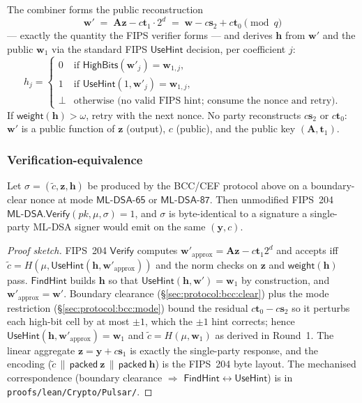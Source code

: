 The combiner forms the public reconstruction
\[
  \mathbf{w}' \;=\; \mathbf{A}\mathbf{z} - c\mathbf{t}_1 \cdot 2^d
  \;=\; \mathbf{w} - c\mathbf{s}_2 + c\mathbf{t}_0
  \pmod q
\]
--- exactly the quantity the FIPS verifier forms --- and derives
$\mathbf{h}$ from $\mathbf{w}'$ and the public $\mathbf{w}_1$ via the
standard FIPS $\mathsf{UseHint}$ decision, per coefficient $j$:
\[
  h_j =
  \begin{cases}
    0 & \text{if } \mathsf{HighBits}(\mathbf{w}'_j) = \mathbf{w}_{1,j}, \\
    1 & \text{if } \mathsf{UseHint}(1, \mathbf{w}'_j) = \mathbf{w}_{1,j}, \\
    \bot & \text{otherwise (no valid FIPS hint; consume the nonce and retry).}
  \end{cases}
\]
If $\mathsf{weight}(\mathbf{h}) > \omega$, retry with the next nonce. No
party reconstructs $c\mathbf{s}_2$ or $c\mathbf{t}_0$: $\mathbf{w}'$ is a
public function of $\mathbf{z}$ (output), $c$ (public), and the public
key $(\mathbf{A}, \mathbf{t}_1)$.

\subsubsection{Verification-equivalence}
\label{sec:protocol:bcc:equiv}

\begin{theorem}
\label{thm:bcc-byte-equal}
Let $\sigma = (\tilde c, \mathbf{z}, \mathbf{h})$ be produced by the
BCC/CEF protocol above on a boundary-clear nonce at mode
$\mathsf{ML\text{-}DSA\text{-}65}$ or $\mathsf{ML\text{-}DSA\text{-}87}$.
Then unmodified FIPS~204 $\mathsf{ML\text{-}DSA.Verify}(\mathit{pk},
\mu, \sigma) = 1$, and $\sigma$ is byte-identical to a signature a
single-party ML-DSA signer would emit on the same $(\mathbf{y}, c)$.
\end{theorem}

\begin{proof}[Proof sketch]
FIPS~204 $\mathsf{Verify}$ computes $\mathbf{w}'_{\text{approx}} =
\mathbf{A}\mathbf{z} - c\mathbf{t}_1 2^d$ and accepts iff $\tilde c =
H(\mu, \mathsf{UseHint}(\mathbf{h}, \mathbf{w}'_{\text{approx}}))$ and the
norm checks on $\mathbf{z}$ and $\mathsf{weight}(\mathbf{h})$ pass.
$\mathsf{FindHint}$ builds $\mathbf{h}$ so that
$\mathsf{UseHint}(\mathbf{h}, \mathbf{w}') = \mathbf{w}_1$ by
construction, and $\mathbf{w}'_{\text{approx}} = \mathbf{w}'$. Boundary
clearance (\S\ref{sec:protocol:bcc:clear}) plus the mode restriction
(\S\ref{sec:protocol:bcc:mode}) bound the residual $c\mathbf{t}_0 -
c\mathbf{s}_2$ so it perturbs each high-bit cell by at most $\pm 1$,
which the $\pm 1$ hint corrects; hence $\mathsf{UseHint}(\mathbf{h},
\mathbf{w}'_{\text{approx}}) = \mathbf{w}_1$ and $\tilde c = H(\mu,
\mathbf{w}_1)$ as derived in Round~1. The linear aggregate $\mathbf{z} =
\mathbf{y} + c\mathbf{s}_1$ is exactly the single-party response, and the
encoding ($\tilde c \,\|\, \mathsf{packed}\ \mathbf{z} \,\|\,
\mathsf{packed}\ \mathbf{h}$) is the FIPS~204 byte layout. The
mechanised correspondence (boundary clearance $\Rightarrow$
$\mathsf{FindHint} \leftrightarrow \mathsf{UseHint}$) is in
\texttt{proofs/lean/Crypto/Pulsar/}.
\end{proof}

